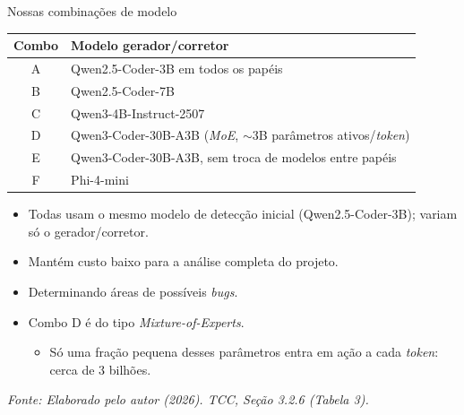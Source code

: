 \documentclass[
    aspectratio=169,
    12pt,
    brazil
]{beamer}
\newcommand{\fonte}[1]{{\tiny\itshape Fonte: #1\par}}
\begin{document}
\begin{frame}{Nossas combinações de modelo}
  \footnotesize
  \begin{table}
  \scriptsize
  \begin{tabular}{cp{9cm}}
  \toprule
  \textbf{Combo} & \textbf{Modelo gerador/corretor} \\
  \midrule
  A & Qwen2.5-Coder-3B em todos os papéis \\
  B & Qwen2.5-Coder-7B \\
  C & Qwen3-4B-Instruct-2507 \\
  D & Qwen3-Coder-30B-A3B (\textit{MoE}, $\sim$3B parâmetros ativos/\textit{token}) \\
  E & Qwen3-Coder-30B-A3B, sem troca de modelos entre papéis \\
  F & Phi-4-mini \\
  \bottomrule
  \end{tabular}
  \end{table}
  \vspace{-0.3cm}
  \begin{itemize}
    \item Todas usam o mesmo modelo de detecção inicial (Qwen2.5-Coder-3B); variam só o gerador/corretor.
    \item Mantém custo baixo para a análise completa do projeto.
    \item Determinando áreas de possíveis \textit{bugs}.
    \item Combo D é do tipo \textit{Mixture-of-Experts}.
    \begin{itemize}
      \item Só uma fração pequena desses parâmetros entra em ação a cada \textit{token}: cerca de 3 bilhões.
    \end{itemize}
  \end{itemize}
  \vspace{-0.10cm}
  \vfill
  \fonte{Elaborado pelo autor (2026). TCC, Seção 3.2.6 (Tabela 3).}
\end{frame}
\end{document}
